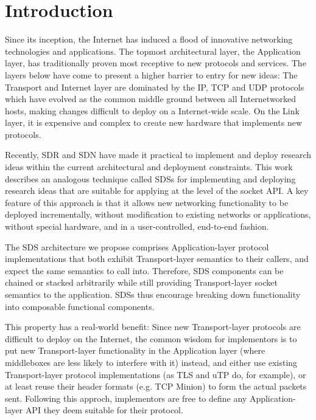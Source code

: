 \section{Introduction}


Since its inception, the Internet has induced a flood of innovative
networking technologies and applications. 
The topmost architectural layer, the Application layer, has traditionally 
proven most receptive to new protocols and services. 
The layers below have come to present a higher barrier to entry for 
new ideas: 
The Transport and Internet layer are dominated by the 
\ac{IP}, \ac{TCP} and \ac{UDP} protocols which have evolved as 
the common middle ground between all Internetworked hosts, 
making changes difficult to deploy on a Internet-wide scale.
On the Link layer, it is expensive and complex to create new hardware 
that implements new protocols.


Recently, \acf{SDR} and \acf{SDN} have made it practical to implement 
and deploy research ideas within the current architectural and 
deployment constraints.
This work describes an analogous technique called 
\acfp{SDS} for implementing and deploying research ideas 
that are suitable for applying at the level of the socket \ac{API}.
A key feature of this approach is that it 
allows new networking functionality to be deployed incrementally,  
without modification to existing networks or applications, 
without special hardware, %
and in a user-controlled, end-to-end fashion.

The \ac{SDS} architecture we propose comprises Application-layer 
protocol implementations that both exhibit Transport-layer semantics 
to their callers, and expect the same semantics to call into. 
Therefore, \ac{SDS} components can be chained or stacked 
arbitrarily while still providing Transport-layer socket semantics 
to the application. 
\acp{SDS} thus encourage breaking down functionality into composable 
functional components.

This property has a real-world benefit:
Since new Transport-layer protocols are difficult to deploy 
on the Internet, the common wisdom for implementors is to put new
Transport-layer functionality in the Application layer 
(where middleboxes are less likely to interfere with it)
instead, and either use existing Transport-layer protocol
implementations (as TLS and uTP do, for example), or at least reuse
their header formats (e.g. TCP Minion) to form the actual packets
sent. Following this approch, implementors are free to define any 
Application-layer \ac{API} they deem suitable for their protocol. 

